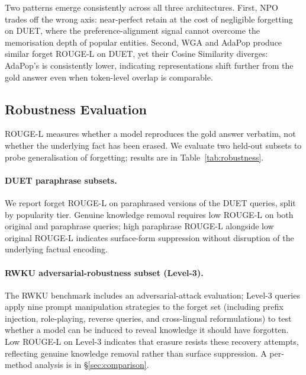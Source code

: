 Two patterns emerge consistently across all three architectures. First, NPO trades off the wrong axis: near-perfect retain at the cost of negligible forgetting on DUET, where the preference-alignment signal cannot overcome the memorisation depth of popular entities. Second, WGA and AdaPop produce similar forget ROUGE-L on DUET, yet their Cosine Similarity diverges: AdaPop's is consistently lower, indicating representations shift further from the gold answer even when token-level overlap is comparable.

\subsection{Robustness Evaluation}
\label{sec:robustness}

ROUGE-L measures whether a model reproduces the gold answer verbatim, not whether the underlying fact has been erased. We evaluate two held-out subsets to probe generalisation of forgetting; results are in Table~\ref{tab:robustness}.

\paragraph{DUET paraphrase subsets.}
We report forget ROUGE-L on paraphrased versions of the DUET queries, split by popularity tier. Genuine knowledge removal requires low ROUGE-L on both original and paraphrase queries; high paraphrase ROUGE-L alongside low original ROUGE-L indicates surface-form suppression without disruption of the underlying factual encoding.

\paragraph{RWKU adversarial-robustness subset (Level-3).}
The RWKU benchmark includes an adversarial-attack evaluation; Level-3 queries apply nine prompt manipulation strategies to the forget set (including prefix injection, role-playing, reverse queries, and cross-lingual reformulations) to test whether a model can be induced to reveal knowledge it should have forgotten. Low ROUGE-L on Level-3 indicates that erasure resists these recovery attempts, reflecting genuine knowledge removal rather than surface suppression. A per-method analysis is in §\ref{sec:comparison}.

